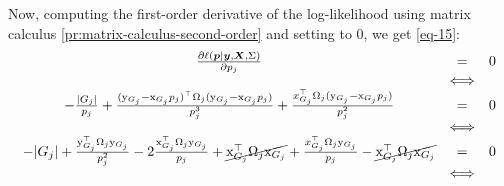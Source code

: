 \documentclass[pdflatex, sn-nature]{sn-jnl}
\theoremstyle{thmstyleone}%
\theoremstyle{thmstyletwo}%
\theoremstyle{thmstylethree}%
\begin{document}
\begin{appendices}
        Now, computing the first-order derivative of the log-likelihood using
        matrix calculus \ref{pr:matrix-calculus-second-order} and setting to $0$,
        we get \ref{eq-15}:
        \begin{equation}
            \label{eq-15}
            \begin{array}{ccl}
                \frac{\partial\ell(\boldsymbol{p}|\boldsymbol{y}, \boldsymbol{X}, \Sigma)}{\partial p_{j}}                                                                                                                                                                                                                                                  & =                   & 0 \\
                                                                                                                                                                                                                                                                                                                                                            & \Longleftrightarrow &   \\
                - \frac{|G_{j}|}{p_{j}} + \frac{(\mathrm{y}_{ G_j}- \mathrm{x}_{G_j}p_{j})^{\top} \Omega_{j}(\mathrm{y}_{ G_j}- \mathrm{x}_{G_j}p_{j})}{p_{j}^{3}} + \frac{x_{G_j}^{\top} \Omega_{j} (\mathrm{y}_{ G_j}- \mathrm{x}_{G_j}p_{j})}{p_{j}^{2}}                                                                                                 & =                   & 0 \\
                                                                                                                                                                                                                                                                                                                                                            & \Longleftrightarrow &   \\
                - |G_j| + \frac{\mathrm{y}_{ G_j}^{\top} \Omega_{j}\mathrm{y}_{ G_j}}{p_{j}^{2}} - 2 \frac{\mathrm{x}_{G_j}^{\top} \Omega_{j}\mathrm{y}_{G_j}}{p_{j}} + \cancel{\mathrm{x}_{G_j}^\top \Omega_{j} \mathrm{x}_{G_j}} + \frac{x_{G_j}^{\top} \Omega_{j} \mathrm{y}_{ G_j}}{p_{j}} - \cancel{\mathrm{x}_{G_j}^\top \Omega_{j} \mathrm{x}_{G_j}} & =                   & 0 \\
                                                                                                                                                                                                                                                                                                                                                            & \Longleftrightarrow &   \\

\end{array}
\end{equation}
\end{appendices}
\end{document}
